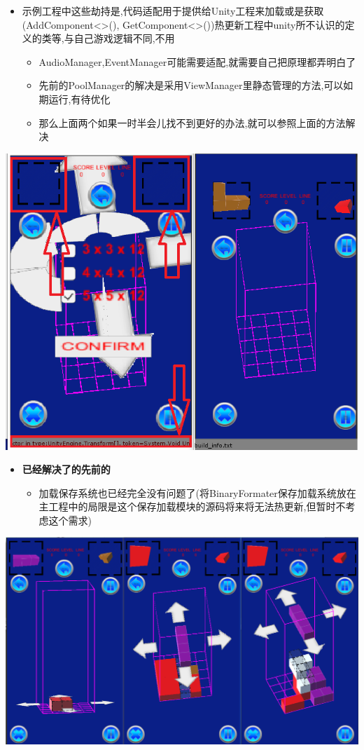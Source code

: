 \documentclass[9pt, b5paper]{article}
\begin{document}
\begin{itemize}
\item 示例工程中这些劫持是,代码适配用于提供给Unity工程来加载或是获取(AddComponent<>(), GetComponent<>())热更新工程中unity所不认识的定义的类等,与自己游戏逻辑不同,不用        

\begin{itemize}
\item AudioManager,EventManager可能需要适配,就需要自己把原理都弄明白了
\item 先前的PoolManager的解决是采用ViewManager里静态管理的方法,可以如期运行,有待优化
\item 那么上面两个如果一时半会儿找不到更好的办法,就可以参照上面的方法解决
\end{itemize}
\end{itemize}

\includegraphics[width=.9\linewidth]{./pic/readme_20221020_195727.png}
\begin{itemize}
\item \textbf{已经解决了的先前的}
\begin{itemize}
\item 加载保存系统也已经完全没有问题了(将BinaryFormater保存加载系统放在主工程中的局限是这个保存加载模块的源码将来将无法热更新,但暂时不考虑这个需求)
\end{itemize}
\end{itemize}

\includegraphics[width=.9\linewidth]{./pic/readme_20221101_170532.png}
\end{document}
